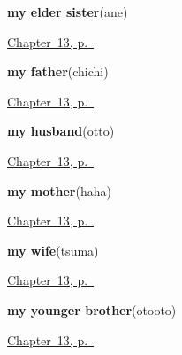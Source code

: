 \noindent\begin{minipage}[t]{\linewidth}
\raggedright
\textbf{my elder sister}\enspace\emph{}\enspace(ane)\par
\footnotesize \hyperref[ch:ja-family-nine]{Chapter~13, p.~\pageref*{ch:ja-family-nine}}
\end{minipage}\par\smallskip

\noindent\begin{minipage}[t]{\linewidth}
\raggedright
\textbf{my father}\enspace\emph{}\enspace(chichi)\par
\footnotesize \hyperref[ch:ja-family-nine]{Chapter~13, p.~\pageref*{ch:ja-family-nine}}
\end{minipage}\par\smallskip

\noindent\begin{minipage}[t]{\linewidth}
\raggedright
\textbf{my husband}\enspace\emph{}\enspace(otto)\par
\footnotesize \hyperref[ch:ja-family-nine]{Chapter~13, p.~\pageref*{ch:ja-family-nine}}
\end{minipage}\par\smallskip

\noindent\begin{minipage}[t]{\linewidth}
\raggedright
\textbf{my mother}\enspace\emph{}\enspace(haha)\par
\footnotesize \hyperref[ch:ja-family-nine]{Chapter~13, p.~\pageref*{ch:ja-family-nine}}
\end{minipage}\par\smallskip

\noindent\begin{minipage}[t]{\linewidth}
\raggedright
\textbf{my wife}\enspace\emph{}\enspace(tsuma)\par
\footnotesize \hyperref[ch:ja-family-nine]{Chapter~13, p.~\pageref*{ch:ja-family-nine}}
\end{minipage}\par\smallskip

\noindent\begin{minipage}[t]{\linewidth}
\raggedright
\textbf{my younger brother}\enspace\emph{}\enspace(otooto)\par
\footnotesize \hyperref[ch:ja-family-nine]{Chapter~13, p.~\pageref*{ch:ja-family-nine}}
\end{minipage}\par\smallskip

